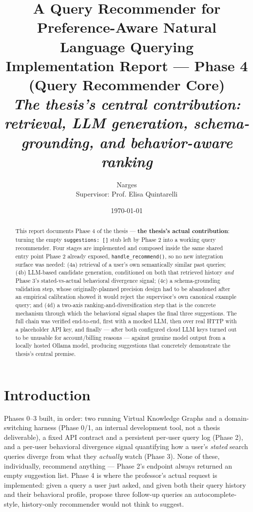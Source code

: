 \documentclass[11pt,a4paper]{article}
\title{\Large \textbf{A Query Recommender for Preference-Aware Natural Language Querying} \\[4pt]
\large Implementation Report --- Phase 4 (Query Recommender Core) \\[2pt]
\normalsize \emph{The thesis's central contribution: retrieval, LLM generation, schema-grounding,
and behavior-aware ranking}}
\author{Narges \\ \small Supervisor: Prof. Elisa Quintarelli}
\date{\today}
\newcommand{\code}[1]{\texttt{#1}}
\begin{document}
\maketitle

\begin{abstract}
\noindent
This report documents Phase 4 of the thesis --- \textbf{the thesis's actual contribution}: turning
the empty \code{suggestions: []} stub left by Phase 2 into a working query recommender. Four
stages are implemented and composed inside the same shared entry point Phase 2 already exposed,
\code{handle\_recommend()}, so no new integration surface was needed: (4a) retrieval of a user's
own semantically similar past queries; (4b) LLM-based candidate generation, conditioned on both
that retrieved history \emph{and} Phase 3's stated-vs-actual behavioral divergence signal; (4c) a
schema-grounding validation step, whose originally-planned precision design had to be abandoned
after an empirical calibration showed it would reject the supervisor's own canonical example
query; and (4d) a two-axis ranking-and-diversification step that is the concrete mechanism through
which the behavioral signal shapes the final three suggestions. The full chain was verified
end-to-end, first with a mocked LLM, then over real HTTP with a placeholder API key, and finally
--- after both configured cloud LLM keys turned out to be unusable for account/billing reasons ---
against genuine model output from a locally hosted Ollama model, producing suggestions that
concretely demonstrate the thesis's central premise.
\end{abstract}

\tableofcontents
\newpage

\section{Introduction}

Phases 0--3 built, in order: two running Virtual Knowledge Graphs and a domain-switching harness
(Phase 0/1, an internal development tool, not a thesis deliverable), a fixed API contract and a
persistent per-user query log (Phase 2), and a per-user behavioral divergence signal quantifying
how a user's \emph{stated} search queries diverge from what they \emph{actually} watch (Phase 3).
None of these, individually, recommend anything --- Phase 2's endpoint always returned an empty
suggestion list. Phase 4 is where the professor's actual request is implemented: given a query a
user just asked, and given both their query history and their behavioral profile, propose three
follow-up queries an autocomplete-style, history-only recommender would not think to suggest.
\end{document}

